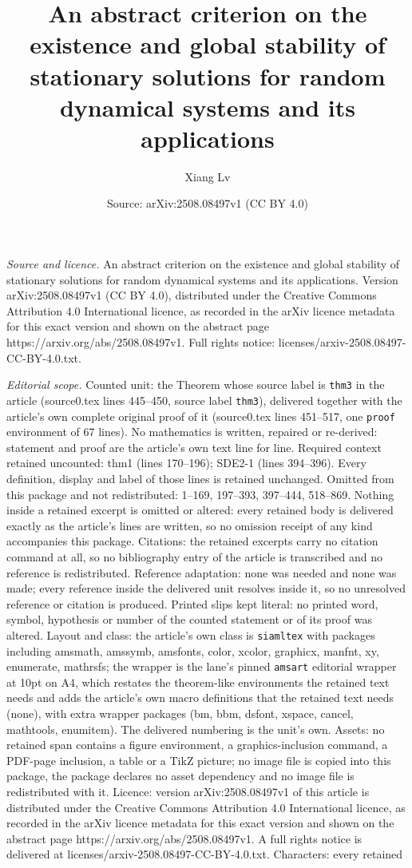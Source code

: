 \documentclass[10pt,a4paper]{amsart}
\title[An abstract criterion on the existence and global stability ]{An abstract criterion on the existence and global stability of stationary solutions for random dynamical systems and its applications}
\author{Xiang Lv}
\date{Source: arXiv:2508.08497v1 (CC BY 4.0)}
\begin{document}
\maketitle

\noindent\emph{Source and licence.} An abstract criterion on the existence and global stability of stationary solutions for random dynamical systems and its applications. Version arXiv:2508.08497v1 (CC BY 4.0), distributed under the Creative Commons Attribution 4.0 International licence, as recorded in the arXiv licence metadata for this exact version and shown on the abstract page https://arxiv.org/abs/2508.08497v1. Full rights notice: licenses/arxiv-2508.08497-CC-BY-4.0.txt.\par\smallskip

\noindent\textit{Editorial scope.} Counted unit: the Theorem whose source label is \texttt{thm3} in the article (source0.tex lines 445--450, source label \texttt{thm3}), delivered together with the article's own complete original proof of it (source0.tex lines 451--517, one \texttt{proof} environment of 67 lines). No mathematics is written, repaired or re-derived: statement and proof are the article's own text line for line. Required context retained uncounted: thm1 (lines 170--196); SDE2-1 (lines 394--396). Every definition, display and label of those lines is retained unchanged. Omitted from this package and not redistributed: 1--169, 197--393, 397--444, 518--869. Nothing inside a retained excerpt is omitted or altered: every retained body is delivered exactly as the article's lines are written, so no omission receipt of any kind accompanies this package. Citations: the retained excerpts carry no citation command at all, so no bibliography entry of the article is transcribed and no reference is redistributed. Reference adaptation: none was needed and none was made; every reference inside the delivered unit resolves inside it, so no unresolved reference or citation is produced. Printed slips kept literal: no printed word, symbol, hypothesis or number of the counted statement or of its proof was altered. Layout and class: the article's own class is \texttt{siamltex} with packages including amsmath, amssymb, amsfonts, color, xcolor, graphicx, manfnt, xy, enumerate, mathrsfs; the wrapper is the lane's pinned \texttt{amsart} editorial wrapper at 10pt on A4, which restates the theorem-like environments the retained text needs and adds the article's own macro definitions that the retained text needs (none), with extra wrapper packages (bm, bbm, dsfont, xspace, cancel, mathtools, enumitem). The delivered numbering is the unit's own. Assets: no retained span contains a figure environment, a graphics-inclusion command, a PDF-page inclusion, a table or a TikZ picture; no image file is copied into this package, the package declares no asset dependency and no image file is redistributed with it. Licence: version arXiv:2508.08497v1 of this article is distributed under the Creative Commons Attribution 4.0 International licence, as recorded in the arXiv licence metadata for this exact version and shown on the abstract page https://arxiv.org/abs/2508.08497v1. A full rights notice is delivered at licenses/arxiv-2508.08497-CC-BY-4.0.txt. Characters: every retained 
\end{document}
